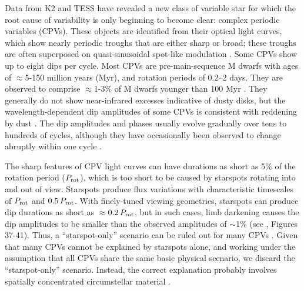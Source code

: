 \documentclass[11pt,twocolumn,tighten]{aastex63}
\begin{document}
Data from K2 \citep{2014PASP..126..398H} and TESS
\citep{2015JATIS...1a4003R} have revealed a new class of variable star
for which the root cause of variability is only beginning to become
clear: complex periodic variables (CPVs).  These objects are identified from
their optical light curves, which show nearly periodic troughs that
are either sharp or broad; these troughs are often superposed on
quasi-sinusoidal spot-like modulation
\citep{2017AJ....153..152S,2018AJ....155...63S,2019ApJ...876..127Z}.
Some CPVs show up to eight dips per cycle.  Most CPVs are
pre-main-sequence M dwarfs with ages of $\approx$5-150 million years
(Myr), and rotation periods of 0.2--2 days.  They are observed to
comprise $\approx$1-3\% of M dwarfs younger than 100 Myr
\citep{2016AJ....152..114R,2022AJ....163..144G}.  They generally do
not show near-infrared excesses indicative of dusty disks, but the
wavelength-dependent dip amplitudes of some CPVs is consistent with
reddening by dust
\citep{2017PASJ...69L...2O,2020AJ....160...86B,2022AJ....163..144G,2023MNRAS.518.2921K}.
The dip amplitudes and phases usually evolve gradually over tens to
hundreds of cycles, although they have occasionally been observed to
change abruptly within one cycle
\citep[e.g.][]{2017AJ....153..152S,2022ApJ...925...75P,2023ApJ...945..114P}.

The sharp features of CPV light curves can have durations as short as
5\% of the rotation period ($P_{\rm rot}$), which is too short to be
caused by starspots rotating into and out of view.  Starspots produce
flux variations with characteristic timescales of $P_{\rm rot}$ and
$0.5\,P_{\rm rot}$.  With finely-tuned viewing geometries, starspots
can produce dip durations as short as $\approx$$0.2\,P_{\rm rot}$, but
in such cases, limb darkening causes the dip amplitudes to be smaller
than the observed amplitudes of $\sim$1\% (see
\citealt{2017AJ....153..152S}, Figures 37-41).  Thus, a
``starspot-only'' scenario can be ruled out for many CPVs
\citep{2017AJ....153..152S,2019ApJ...876..127Z,2021MNRAS.500.1366K}.
Given that many CPVs cannot be explained by starspots alone, and
working under the assumption that all CPVs share the same basic
physical scenario, we discard the ``starspot-only'' scenario.
Instead, the correct explanation probably involves spatially concentrated
circumstellar material
\citep[e.g.][]{2017AJ....153..152S,2022AJ....163..144G}.
\end{document}
